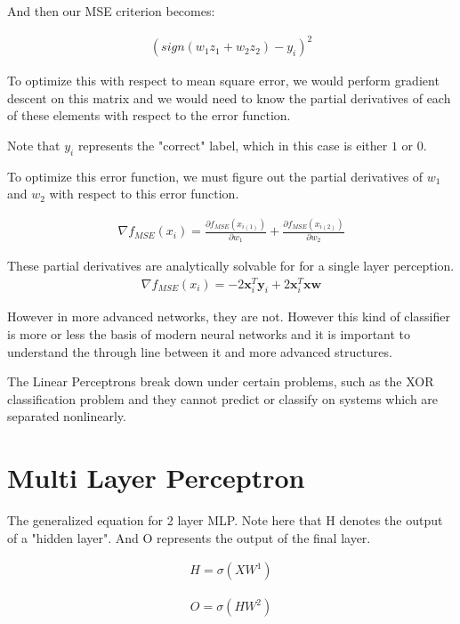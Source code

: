 \documentclass{article}
\begin{document}
And then our MSE criterion becomes:

\begin{align*}
(sign(w_1z_1 + w_2 z_2) - y_i)^2
\end{align*}

To optimize this with respect to mean square error, we would perform gradient descent on this matrix and we would need to know the partial derivatives of each of these elements with respect to the error function.

Note that $y_i$ represents the "correct" label, which in this case is either $1$ or $0$.

To optimize this error function, we must figure out the partial derivatives of $w_1$ and $w_2$ with respect to this error function.

\begin{align*}
\nabla f_{MSE}(x_i) = \frac{\partial f_{MSE}(x_{i(1)})}{\partial w_1} + \frac{\partial f_{MSE}(x_{i(2)})}{\partial w_2}
\end{align*}

These partial derivatives are analytically solvable for for a single layer perception.
\begin{align*}
\nabla f_{MSE}(x_i) = -2\mathbf{x}_i^T \mathbf{y}_i + 2\mathbf{x}_i^T \mathbf{x} \mathbf{w}
\end{align*}

However in more advanced networks, they are not. However this kind of classifier is more or less the basis of modern neural networks and it is important to understand the through line between it and more advanced structures.

The Linear Perceptrons break down under certain problems, such as the XOR classification problem and they cannot predict or classify on systems which are separated nonlinearly.



\section{Multi Layer Perceptron}

The generalized equation for 2 layer MLP. Note here that H denotes the output of a "hidden layer". And O represents the output of the final layer.

\begin{align*}
H = \sigma(XW^{1}) 
\end{align*}

\begin{align*}
O = \sigma(HW^{2}) 
\end{align*}
\end{document}
